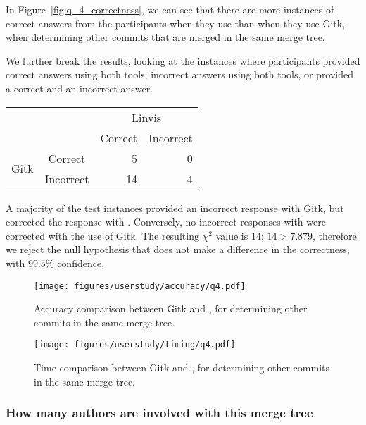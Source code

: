 In Figure~\ref{fig:q_4_correctness}, we can see that there are more
instances of correct answers from the participants when they use \tool
than when they use Gitk, when determining other commits that are merged
in the same merge tree.

We further break the results, looking at the instances where
participants provided correct answers using both tools, incorrect
answers using both tools, or provided a correct and an incorrect answer.

\begin{center}
  \begin{tabular}{cc|rr}
                           &           & \multicolumn{2}{c}{Linvis}\\
                           &           & Correct                      & Incorrect\\\hline
    \multirow{2}{*}{Gitk}  & Correct   & 5                            & 0\\
                           & Incorrect & 14                           & 4\\
  \end{tabular}
\end{center}

A majority of the test instances provided an incorrect response with
Gitk, but corrected the response with \tool. Conversely, no incorrect
responses with \tool were corrected with the use of Gitk. The resulting
$\chi^2$ value is 14; $14 > 7.879$, therefore we reject the null
hypothesis that \tool does not make a difference in the correctness,
with $99.5\%$ confidence.

\begin{figure}[htpb]
  \centering
  \texttt{[image: figures/userstudy/accuracy/q4.pdf]}
  \caption{Accuracy comparison between Gitk and \tool, for determining
    other commits in the same merge tree.}
  \label{fig:q4_accuracy}
\end{figure}

\begin{figure}[htpb]
  \centering
  \texttt{[image: figures/userstudy/timing/q4.pdf]}
  \caption{Time comparison between Gitk and \tool, for determining
    other commits in the same merge tree.}
  \label{fig:q4_timing}
\end{figure}

\subsubsection{How many authors are involved with this merge tree}
\label{ssub:how_many_authors_are_involved_with_this_merge_tree}


